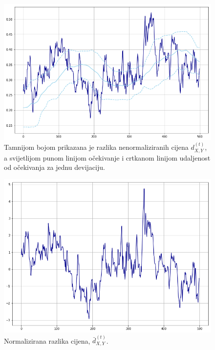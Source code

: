 \documentclass[lmodern, utf8, diplomski, numeric]{fer}
\newcommand{\norm}[1]{\bar{#1}}
\newcommand{\q}{\left}
\newcommand{\w}{\right}
\begin{document}
  \begin{figure}[H]
    \centering
    \includegraphics[width=1.0\linewidth]{graphics/diff.png}
    \caption{Tamnijom bojom prikazana je razlika nenormaliziranih cijena $d_{X,Y}^{(t)}$, a svijetlijom punom linijom očekivanje i crtkanom linijom udaljenost od očekivanja za jednu devijaciju.}
    \label{fig:diff}
  \end{figure}

  \begin{figure}[H]
    \centering
    \includegraphics[width=1.0\linewidth]{graphics/diff-norm.png}
    \caption{
      Normalizirana razlika cijena, $\norm{d}_{X,Y}^{\q(t\w)}$.}
    \label{fig:diff-norm}
  \end{figure}
  
\end{document}
